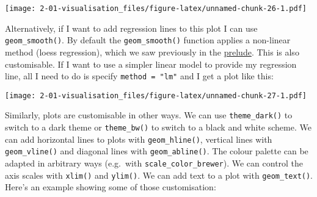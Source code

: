 \documentclass[]{book}
\newenvironment{Shaded}{\begin{snugshade}}{\end{snugshade}}
\newcommand{\DataTypeTok}[1]{\textcolor[rgb]{0.13,0.29,0.53}{#1}}
\newcommand{\DecValTok}[1]{\textcolor[rgb]{0.00,0.00,0.81}{#1}}
\newcommand{\KeywordTok}[1]{\textcolor[rgb]{0.13,0.29,0.53}{\textbf{#1}}}
\newcommand{\NormalTok}[1]{#1}
\newcommand{\OperatorTok}[1]{\textcolor[rgb]{0.81,0.36,0.00}{\textbf{#1}}}
\newcommand{\StringTok}[1]{\textcolor[rgb]{0.31,0.60,0.02}{#1}}
\begin{document}
\texttt{[image: 2-01-visualisation\_files/figure-latex/unnamed-chunk-26-1.pdf]}

Alternatively, if I want to add regression lines to this plot I can use \texttt{geom\_smooth()}. By default the \texttt{geom\_smooth()} function applies a non-linear method (loess regression), which we saw previously in the \href{./prelude-to-data.html}{prelude}. This is also customisable. If I want to use a simpler linear model to provide my regression line, all I need to do is specify \texttt{method\ =\ "lm"} and I get a plot like this:

\begin{Shaded}
\end{Shaded}

\texttt{[image: 2-01-visualisation\_files/figure-latex/unnamed-chunk-27-1.pdf]}

Similarly, plots are customisable in other ways. We can use \texttt{theme\_dark()} to switch to a dark theme or \texttt{theme\_bw()} to switch to a black and white scheme. We can add horizontal lines to plots with \texttt{geom\_hline()}, vertical lines with \texttt{geom\_vline()} and diagonal lines with \texttt{geom\_abline()}. The colour palette can be adapted in arbitrary ways (e.g.~with \texttt{scale\_color\_brewer}). We can control the axis scales with \texttt{xlim()} and \texttt{ylim()}. We can add text to a plot with \texttt{geom\_text()}. Here's an example showing some of those customisation:
\end{document}
